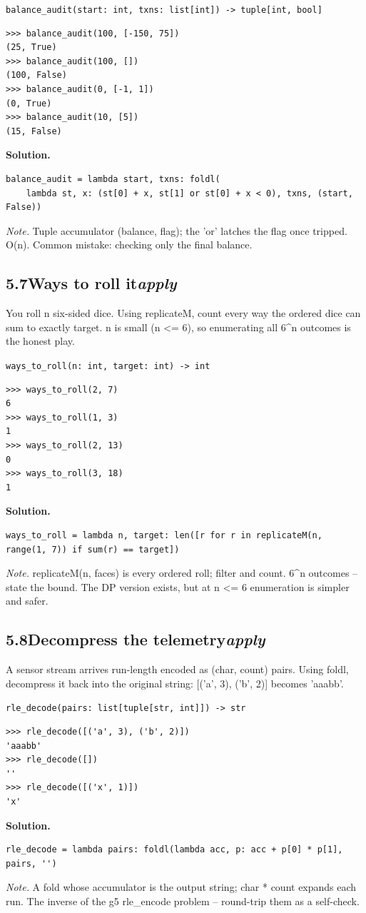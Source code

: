 \documentclass[10pt,letterpaper]{book}
\begin{document}
\noindent\texttt{balance\_audit(start: int, txns: list[int]) -> tuple[int, bool]}
\begin{lstlisting}[style=ex]
>>> balance_audit(100, [-150, 75])
(25, True)
>>> balance_audit(100, [])
(100, False)
>>> balance_audit(0, [-1, 1])
(0, True)
>>> balance_audit(10, [5])
(15, False)
\end{lstlisting}
\noindent\textbf{Solution.}
\begin{lstlisting}[style=code]
balance_audit = lambda start, txns: foldl(
    lambda st, x: (st[0] + x, st[1] or st[0] + x < 0), txns, (start, False))
\end{lstlisting}
\noindent\textit{Note.} Tuple accumulator (balance, flag); the 'or' latches the flag once tripped. O(n). Common mistake: checking only the final balance.

\subsection*{5.7\quad Ways to roll it\hfill\textnormal{\textit{apply}}}
You roll n six-sided dice. Using replicateM, count every way the ordered dice can sum to exactly target. n is small (n <= 6), so enumerating all 6\^{}n outcomes is the honest play.

\noindent\texttt{ways\_to\_roll(n: int, target: int) -> int}
\begin{lstlisting}[style=ex]
>>> ways_to_roll(2, 7)
6
>>> ways_to_roll(1, 3)
1
>>> ways_to_roll(2, 13)
0
>>> ways_to_roll(3, 18)
1
\end{lstlisting}
\noindent\textbf{Solution.}
\begin{lstlisting}[style=code]
ways_to_roll = lambda n, target: len([r for r in replicateM(n, range(1, 7)) if sum(r) == target])
\end{lstlisting}
\noindent\textit{Note.} replicateM(n, faces) is every ordered roll; filter and count. 6\^{}n outcomes -- state the bound. The DP version exists, but at n <= 6 enumeration is simpler and safer.

\subsection*{5.8\quad Decompress the telemetry\hfill\textnormal{\textit{apply}}}
A sensor stream arrives run-length encoded as (char, count) pairs. Using foldl, decompress it back into the original string: [('a', 3), ('b', 2)] becomes 'aaabb'.

\noindent\texttt{rle\_decode(pairs: list[tuple[str, int]]) -> str}
\begin{lstlisting}[style=ex]
>>> rle_decode([('a', 3), ('b', 2)])
'aaabb'
>>> rle_decode([])
''
>>> rle_decode([('x', 1)])
'x'
\end{lstlisting}
\noindent\textbf{Solution.}
\begin{lstlisting}[style=code]
rle_decode = lambda pairs: foldl(lambda acc, p: acc + p[0] * p[1], pairs, '')
\end{lstlisting}
\noindent\textit{Note.} A fold whose accumulator is the output string; char * count expands each run. The inverse of the g5 rle\_encode problem -- round-trip them as a self-check.
\end{document}
